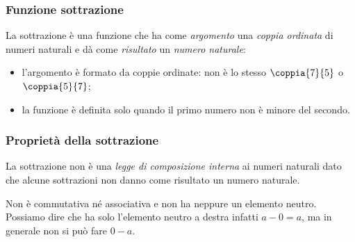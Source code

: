 \subsubsection{Funzione sottrazione}

La sottrazione è una funzione che ha come \emph{argomento} una \emph{coppia 
ordinata} di numeri naturali e dà come \emph{risultato} un \emph{numero 
naturale}:

\vspace{.5em}
\begin{minipage}[t]{.48\textwidth}
\begin{center}
\begin{inaccessibleblock}
\end{inaccessibleblock}
\end{center}
\end{minipage}
\hfill
\begin{minipage}[t]{.48\textwidth}
\begin{center}
\begin{inaccessibleblock}
\end{inaccessibleblock}
\end{center}
\end{minipage}

\begin{osservazioni}{}{}
\begin{itemize} [nosep]
\item l'argomento è formato da coppie ordinate: non è lo stesso 
\(\coppia{7}{5}\) o \(\coppia{5}{7}\);
\item la funzione è definita solo quando il primo numero non è 
minore del secondo.
\end{itemize}

\end{osservazioni}

\subsubsection{Proprietà della sottrazione}

La sottrazione non è una \emph{legge di composizione interna} ai numeri 
naturali dato che alcune sottrazioni non danno come risultato un numero
naturale.

Non è commutativa né associativa e non ha neppure un elemento neutro.
Possiamo dire che ha solo l'elemento neutro a destra infatti \(a - 0 = a\), 
ma in generale non si può fare \(0 - a\).

